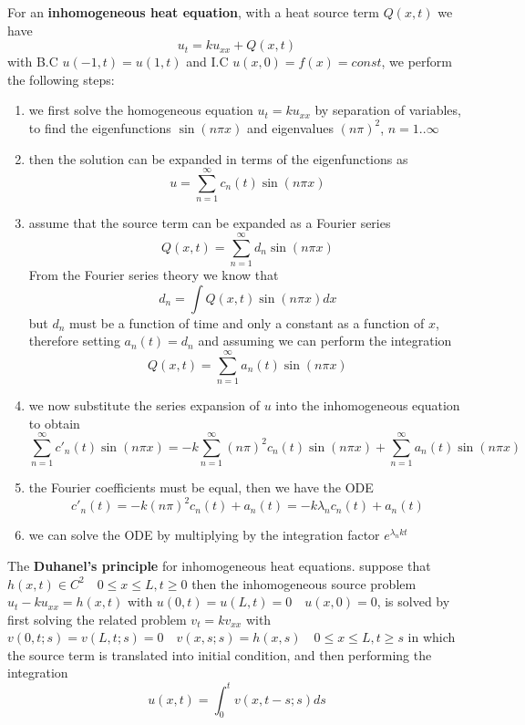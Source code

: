 \documentclass[12pt]{paper}
\begin{document}
For an \textbf{inhomogeneous heat equation}, with a heat source term $Q(x,t)$ we have 
\begin{equation*}
u_t=ku_{xx}+Q(x,t)
\end{equation*}
with B.C $u(-1,t)=u(1,t)$ and I.C $u(x,0)=f(x)=const$, we perform the following steps:
\begin{enumerate}
\item we first solve the homogeneous equation $u_t=ku_{xx}$ by separation of variables, to find the eigenfunctions $\sin(n\pi x)$ and eigenvalues $(n\pi)^2$, $n=1..\infty$
\item then the solution can be expanded in terms of the eigenfunctions as 
\begin{equation*}
u=\sum_{n=1}^{\infty}c_n(t)\sin(n\pi x)
\end{equation*}
\item assume that the source term can be expanded as a Fourier series
\begin{equation*}
Q(x,t)= \sum_{n=1}^{\infty}d_n\sin(n\pi x)
\end{equation*}
From the Fourier series theory we know that 
\begin{equation*}
d_n=\int Q(x,t)\sin(n\pi x)dx
\end{equation*}
but $d_n$ must be a function of time and only a constant as a function of $x$, therefore setting $a_n(t) = d_n$ and assuming we can perform the integration 
\begin{equation*}
Q(x,t) = \sum_{n=1}^{\infty}a_n(t)\sin(n\pi x)
\end{equation*}
\item we now substitute the series expansion of $u$ into the inhomogeneous equation to obtain 
\begin{equation*}
\sum_{n=1}^{\infty}c'_n(t)\sin(n\pi x)=-k\sum_{n=1}^{\infty}(n\pi)^2c_n(t)\sin(n\pi x)+\sum_{n=1}^{\infty}a_n(t)\sin(n\pi x)
\end{equation*}
\item the Fourier coefficients must be equal, then we have the ODE
\begin{equation*}
c'_n(t)= -k(n\pi)^2 c_n(t)+a_n(t)=-k\lambda_n c_n(t)+a_n(t)
\end{equation*}
\item we can solve the ODE by multiplying by the integration factor $e^{\lambda_n k t}$
\end{enumerate}

The \textbf{Duhanel's principle} for inhomogeneous heat equations. suppose that $h(x,t)\in C^2 \quad 0\leq x\leq L, t\geq 0$ 
then the inhomogeneous source problem $u_t-ku_{xx}=h(x,t)$ with $u(0,t)=u(L,t)=0 \quad u(x,0)=	0$, is solved by first solving the related problem 
$v_t=kv_{xx}$ with $v(0,t;s)=v(L,t;s)=0 \quad v(x,s;s)=h(x,s)\quad 0\leq x\leq L, t\geq s$
in which the source term is translated into initial condition, and then performing the integration 
\begin{equation*}
u(x,t)= \int_0^t v(x,t-s;s)ds
\end{equation*}
\end{document}
